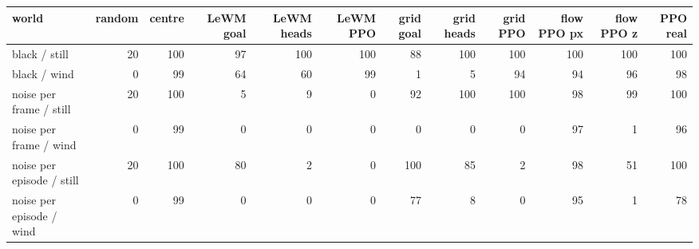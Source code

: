 \begin{tabular}{lrrrrrrrrrrr}
\toprule
world & random & centre & LeWM goal & LeWM heads & LeWM PPO & grid goal & grid heads & grid PPO & flow PPO px & flow PPO z & PPO real \\
\midrule
black / still & 20 & 100 & 97 & 100 & 100 & 88 & 100 & 100 & 100 & 100 & 100 \\
black / wind & 0 & 99 & 64 & 60 & 99 & 1 & 5 & 94 & 94 & 96 & 98 \\
noise per frame / still & 20 & 100 & 5 & 9 & 0 & 92 & 100 & 100 & 98 & 99 & 100 \\
noise per frame / wind & 0 & 99 & 0 & 0 & 0 & 0 & 0 & 0 & 97 & 1 & 96 \\
noise per episode / still & 20 & 100 & 80 & 2 & 0 & 100 & 85 & 2 & 98 & 51 & 100 \\
noise per episode / wind & 0 & 99 & 0 & 0 & 0 & 77 & 8 & 0 & 95 & 1 & 78 \\
\bottomrule
\end{tabular}
